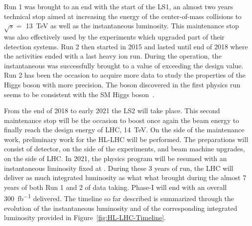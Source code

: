 	Run 1 was brought to an end with the start of the \acl{LS1}, an almost two years technical stop aimed at increasing the energy of the center-of-mass collisions to $\sqrt{s} =$ \SI{13}{TeV} as well as the instantaneous luminosity. This maintenance stop was also effectively used by the experiments which upgraded part of their detection systems. Run 2 then started in 2015 and lasted until end of 2018 where the activities ended with a last heavy ion run. During the operation, the instantaneous was successfully brought to a value of \siflux exceeding the design value. Run 2 has been the occasion to acquire more data to study the properties of the Higgs boson with more precision. The boson discovered in the first physics run seems to be consistent with the SM Higgs boson~\cite{HIGGS2015}.
	
	From the end of 2018 to early 2021 the \acl{LS2} will take place. This second maintenance stop will be the occasion to boost once again the beam energy to finally reach the design energy of LHC, \SI{14}{TeV}. On the side of the maintenance work, preliminary work for the \acl{HL-LHC} will be performed. The preparations will consist of detector, on the side of the experiments, and beam machine upgrades, on the side of LHC. In 2021, the physics program will be resumed with an instantaneous liminosity fixed at \siflux. During these 3 years of run, the LHC will deliver as much integrated luminosity as what what brought during the almost 7 years of both Run 1 and 2 of data taking. Phase-I will end with an overall \SI{300}{fb^{-1}} delivered. The timeline so far described is summarized through the evolution of the instantaneous luminosity and of the corresponding integrated luminosity provided in Figure~\ref{fig:HL-LHC-Timeline}.
	
